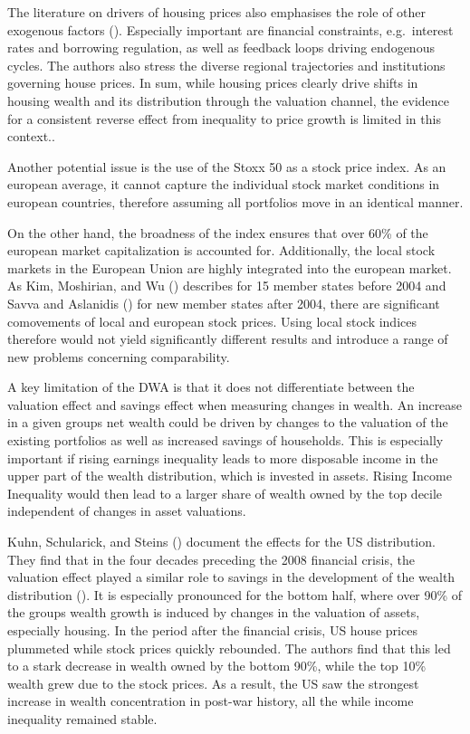 \documentclass[
  a4paper,
  DIV=11,
  numbers=noendperiod]{scrartcl}
\begin{document}
The literature on drivers of housing prices also emphasises the role of
other exogenous factors (). Especially important are financial
constraints, e.g.~interest rates and borrowing regulation, as well as
feedback loops driving endogenous cycles. The authors also stress the
diverse regional trajectories and institutions governing house prices.
In sum, while housing prices clearly drive shifts in housing wealth and
its distribution through the valuation channel, the evidence for a
consistent reverse effect from inequality to price growth is limited in
this context..

Another potential issue is the use of the Stoxx 50 as a stock price
index. As an european average, it cannot capture the individual stock
market conditions in european countries, therefore assuming all
portfolios move in an identical manner.

On the other hand, the broadness of the index ensures that over 60\% of
the european market capitalization is accounted for. Additionally, the
local stock markets in the European Union are highly integrated into the
european market. As Kim, Moshirian, and Wu
() describes for 15 member
states before 2004 and Savva and Aslanidis
() for new member
states after 2004, there are significant comovements of local and
european stock prices. Using local stock indices therefore would not
yield significantly different results and introduce a range of new
problems concerning comparability.

A key limitation of the DWA is that it does not differentiate between
the valuation effect and savings effect when measuring changes in
wealth. An increase in a given groups net wealth could be driven by
changes to the valuation of the existing portfolios as well as increased
savings of households. This is especially important if rising earnings
inequality leads to more disposable income in the upper part of the
wealth distribution, which is invested in assets. Rising Income
Inequality would then lead to a larger share of wealth owned by the top
decile independent of changes in asset valuations.

Kuhn, Schularick, and Steins
() document the
effects for the US distribution. They find that in the four decades
preceding the 2008 financial crisis, the valuation effect played a
similar role to savings in the development of the wealth distribution
(). It is
especially pronounced for the bottom half, where over 90\% of the groups
wealth growth is induced by changes in the valuation of assets,
especially housing. In the period after the financial crisis, US house
prices plummeted while stock prices quickly rebounded. The authors find
that this led to a stark decrease in wealth owned by the bottom 90\%,
while the top 10\% wealth grew due to the stock prices. As a result, the
US saw the strongest increase in wealth concentration in post-war
history, all the while income inequality remained stable.
\end{document}
